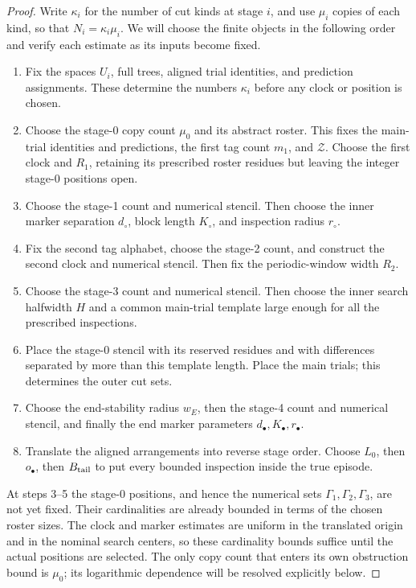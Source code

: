 \begin{proof}
Write \(\kappa_i\) for the number of cut kinds at stage \(i\), and
use \(\mu_i\) copies of each kind, so that
\(N_i=\kappa_i\mu_i\). We will choose the finite objects in the
following order and verify each estimate as its inputs become fixed.
\begin{enumerate}
\item Fix the spaces \(U_i\), full trees, aligned trial identities,
      and prediction assignments. These determine the numbers
      \(\kappa_i\) before any clock or position is chosen.
\item Choose the stage-0 copy count \(\mu_0\) and its abstract roster.
      This fixes the main-trial identities and predictions, the first
      tag count \(m_1\), and \(\mathcal Z\). Choose the first clock
      and \(R_1\), retaining its prescribed roster residues but
      leaving the integer stage-0 positions open.
\item Choose the stage-1 count and numerical stencil. Then choose
      the inner marker separation \(d_\circ\), block length
      \(K_\circ\), and inspection radius \(r_\circ\).
\item Fix the second tag alphabet, choose the stage-2 count, and
      construct the second clock and numerical stencil. Then fix
      the periodic-window width \(R_2\).
\item Choose the stage-3 count and numerical stencil. Then choose
      the inner search halfwidth \(H\) and a common main-trial
      template large enough for all the prescribed inspections.
\item Place the stage-0 stencil with its reserved residues and with
      differences separated by more than this template length.
      Place the main trials; this determines the outer cut sets.
\item Choose the end-stability radius \(w_E\), then the stage-4
      count and numerical stencil, and finally the end marker
      parameters \(d_\bullet,K_\bullet,r_\bullet\).
\item Translate the aligned arrangements into reverse stage order.
      Choose \(L_0\), then \(o_\bullet\), then \(B_{\rm tail}\)
      to put every bounded inspection inside the true episode.
\end{enumerate}

At steps 3--5 the stage-0 positions, and hence the numerical sets
\(\Gamma_1,\Gamma_2,\Gamma_3\), are not yet fixed. Their cardinalities are already
bounded in terms of the chosen roster sizes. The clock and marker
estimates are uniform in the translated origin and in the nominal
search centers, so these cardinality bounds suffice until the actual
positions are selected. The only copy count that enters its own
obstruction bound is \(\mu_0\); its logarithmic dependence will be
resolved explicitly below.


\end{proof}
